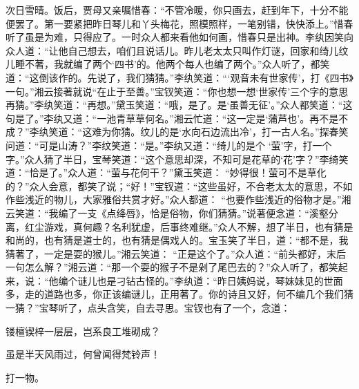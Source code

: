 \begin{parag}
    次日雪晴。饭后，贾母又亲嘱惜春：“不管冷暖，你只画去，赶到年下，十分不能便罢了。第一要紧把昨日琴儿和丫头梅花，照模照样，一笔别错，快快添上。”惜春听了虽是为难，只得应了。一时众人都来看他如何画，惜春只是出神。李纨因笑向众人道：“让他自己想去，咱们且说话儿。昨儿老太太只叫作灯谜，回家和绮儿纹儿睡不著，我就编了两个‘四书’的。他两个每人也编了两个。”众人听了，都笑道：“这倒该作的。先说了，我们猜猜。”李纨笑道：“‘观音未有世家传’，打《四书》一句。”湘云接著就说“在止于至善。”宝钗笑道：“你也想一想‘世家传’三个字的意思再猜。”李纨笑道：“再想。”黛玉笑道：“哦，是了。是‘虽善无征’。”众人都笑道：“这句是了。”李纨又道：“一池青草草何名。”湘云忙道：“这一定是‘蒲芦也’。再不是不成？”李纨笑道：“这难为你猜。纹儿的是‘水向石边流出冷’，打一古人名。”探春笑问道：“可是山涛？”李纹笑道：“是。”李纨又道：“绮儿的是个 ‘萤’字，打一个字。”众人猜了半日，宝琴笑道：“这个意思却深，不知可是花草的‘花’字？”李绮笑道：“恰是了。”众人道：“萤与花何干？”黛玉笑道： “妙得很！萤可不是草化的？”众人会意，都笑了说；“好！”宝钗道：“这些虽好，不合老太太的意思，不如作些浅近的物儿，大家雅俗共赏才好。”众人都道： “也要作些浅近的俗物才是。”湘云笑道：“我编了一支《点绛唇》，恰是俗物，你们猜猜。”说著便念道：“溪壑分离，红尘游戏，真何趣？名利犹虚，后事终难继。”众人不解，想了半日，也有猜是和尚的，也有猜是道士的，也有猜是偶戏人的。宝玉笑了半日，道：“都不是，我猜著了，一定是耍的猴儿。”湘云笑道： “正是这个了。”众人道：“前头都好，末后一句怎么解？”湘云道：“那一个耍的猴子不是剁了尾巴去的？”众人听了，都笑起来，说：“他编个谜儿也是刁钻古怪的。”李纨道：“昨日姨妈说，琴妹妹见的世面多，走的道路也多，你正该编谜儿，正用著了。你的诗且又好，何不编几个我们猜一猜？”宝琴听了，点头含笑，自去寻思。宝钗也有了一个，念道：
\end{parag}
\begin{poem}

    \begin{pl}

        镂檀锲梓一层层，岂系良工堆砌成？
    \end{pl}
    \begin{pl}

        虽是半天风雨过，何曾闻得梵铃声！
    \end{pl}

\end{poem}

\begin{parag}
    打一物。
\end{parag}


